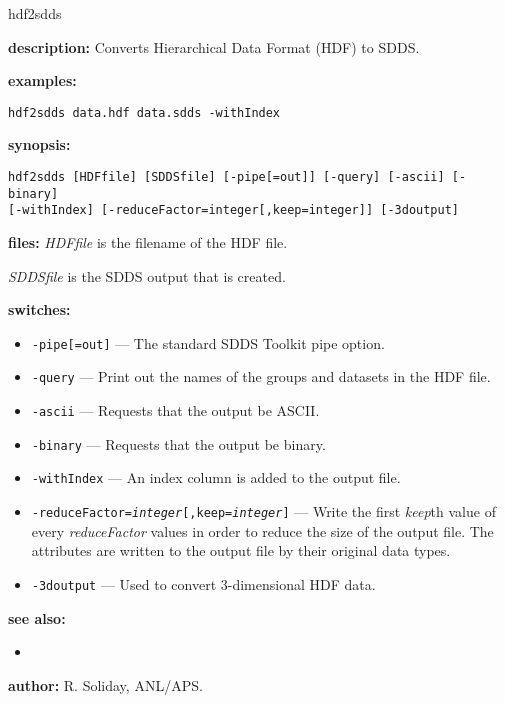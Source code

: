 \begin{sddsprog}{hdf2sdds}
\item {\bf description:} Converts Hierarchical Data Format (HDF) to SDDS.
\item {\bf examples:}
\begin{verbatim}
hdf2sdds data.hdf data.sdds -withIndex
\end{verbatim}
\item {\bf synopsis:}
\begin{verbatim}
hdf2sdds [HDFfile] [SDDSfile] [-pipe[=out]] [-query] [-ascii] [-binary]
[-withIndex] [-reduceFactor=integer[,keep=integer]] [-3doutput]
\end{verbatim}
\item {\bf files:}
{\em HDFfile} is the filename of the HDF file.

{\em SDDSfile} is the SDDS output that is created.
\item {\bf switches:}
\begin{itemize}
  \item \verb|-pipe[=out]| --- The standard SDDS Toolkit pipe option.
  \item \verb|-query| --- Print out the names of the groups and datasets in the HDF file.
  \item \verb|-ascii| --- Requests that the output be ASCII.
  \item \verb|-binary| --- Requests that the output be binary.
  \item \verb|-withIndex| --- An index column is added to the output file.
  \item {\tt -reduceFactor={\em integer}[,keep={\em integer}]} --- Write the first {\em keep}th value of every {\em reduceFactor} values in order to reduce the size of the output file. The attributes are written to the output file by their original data types.
  \item \verb|-3doutput| --- Used to convert 3-dimensional HDF data.
\end{itemize}
\item {\bf see also:}
\begin{itemize}
  \item {}
\end{itemize}
\item {\bf author:} R. Soliday, ANL/APS.
\end{sddsprog}

